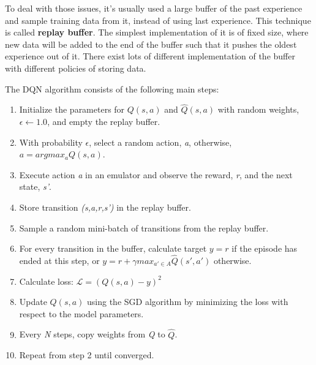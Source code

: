 \documentclass[12pt]{article}
\begin{document}
To deal with those issues, it's usually used a large buffer of the past experience and sample training data from it, instead of using last experience. This technique is called \textbf{replay buffer}. The simplest implementation of it is of fixed size, where new data will be added to the end of the buffer such that it pushes the oldest experience out of it. There exist lots of different implementation of the buffer with different policies of storing data. 

The DQN algorithm consists of the following main steps:
\begin{enumerate}
    \item Initialize the parameters for $Q(s,a)$ and $\hat{Q}(s,a)$ with random weights, $\epsilon \leftarrow 1.0$, and empty the replay buffer.
    \item With probability $\epsilon$, select a random action, \textit{a}, otherwise, $a=argmax_aQ(s,a)$.
    \item Execute action \textit{a} in an emulator and observe the reward, \textit{r}, and the next state, \textit{s'}.
    \item Store transition \textit{(s,a,r,s')} in the replay buffer.
    \item Sample a random mini-batch of transitions from the replay buffer.
    \item For every transition in the buffer, calculate target $y=r$ if the episode has ended at this step, or $y=r+\gamma max_{a' \in A} \hat{Q}(s',a')$ otherwise.
    \item Calculate loss: $\mathcal{L}=(Q(s,a) - y)^2$
    \item Update $Q(s,a)$ using the SGD algorithm by minimizing the loss with respect to the model parameters.
    \item Every \textit{N} steps, copy weights from \textit{Q} to $\hat{Q}$.
    \item Repeat from step 2 until converged.
    \end{enumerate}
\end{document}
